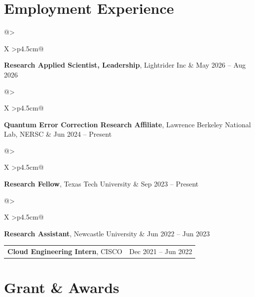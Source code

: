 \documentclass[10pt, letterpaper]{article}
\makeatletter
\newcommand{\datedentry}[2]{%
    \begin{tabularx}{\linewidth}{@{}>{\raggedright\arraybackslash}X
                                  >{\raggedleft\arraybackslash}p{4.5cm}@{}}
        #1 & #2
    \end{tabularx}%
}
\makeatother
\begin{document}
\section{Employment Experience}

\datedentry{\textbf{Research Applied Scientist, Leadership}, Lightrider Inc}{May 2026 -- Aug 2026}

\vspace{0.2cm}
\datedentry{\textbf{Quantum Error Correction Research Affiliate}, Lawrence Berkeley National Lab, NERSC}{Jun 2024 -- Present}

\vspace{0.2cm}
\datedentry{\textbf{Research Fellow}, Texas Tech University}{Sep 2023 -- Present}

\vspace{0.2cm}
\datedentry{\textbf{Research Assistant}, Newcastle University}{Jun 2022 -- Jun 2023}

\vspace{0.2cm}
\datedentry{\textbf{Cloud Engineering Intern}, CISCO}{Dec 2021 -- Jun 2022}

\section{Grant \& Awards}
\end{document}
